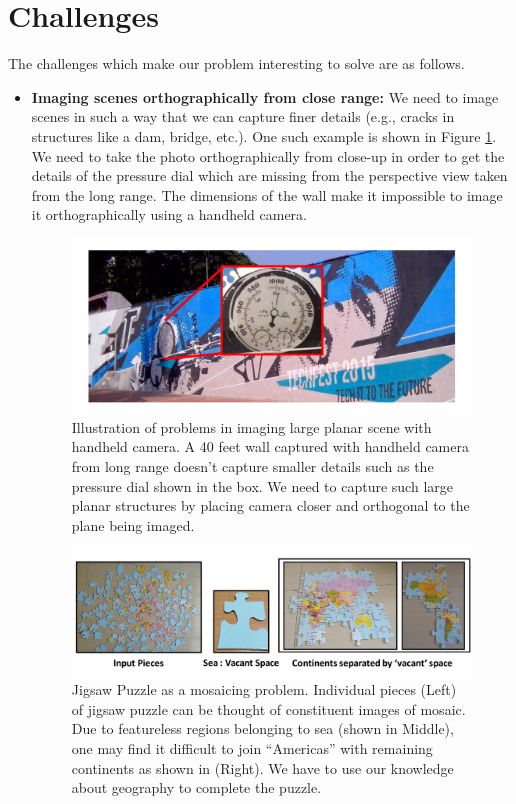 \section*{Challenges}
The challenges which make our problem interesting to solve are as follows. 
\begin{itemize}
  \item \textbf{Imaging scenes orthographically from close range:}
We need to image scenes in such a way that we can capture finer details
(e.g., cracks in structures like a dam, bridge, etc.). One such example is shown
in Figure \ref{fig:orthographicView}. We need to take the photo
orthographically from close-up in order to get the details of the pressure dial
which are missing from the perspective view taken from the long range. The
dimensions of the wall make it impossible to image it orthographically  using
a handheld camera. 

\begin{figure}[h!]
\centering
\includegraphics[width=0.98\linewidth]{figures/orthographicView}
\caption[Problems in imaging large scene using handheld camera]{Illustration of
problems in imaging large planar scene with handheld camera. A 40 feet wall
captured with handheld camera from long range doesn't capture smaller details
such as the pressure dial shown in the box. We need to capture such large
planar structures by placing camera closer and orthogonal to the plane being imaged.}
\label{fig:orthographicView}
\end{figure}

\begin{figure}[h!]
\centering
\includegraphics[width=0.98\linewidth]{figures/vacantSpaces}
\caption[Jigsaw Puzzle as a mosaicing problem]{Jigsaw Puzzle as a mosaicing
problem. Individual pieces (Left) of jigsaw puzzle can be thought of constituent images of mosaic. Due to featureless
regions belonging to sea (shown in Middle), one may find it difficult to join
``Americas'' with remaining continents as shown in (Right). We have to use
our knowledge about geography to complete the puzzle.}
\label{fig:vacantSpaces}
\end{figure}
  

\end{itemize}
